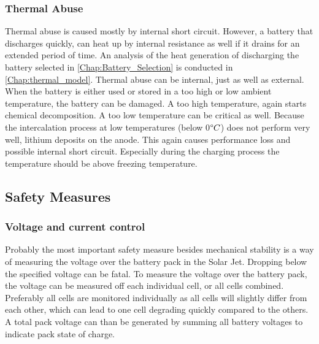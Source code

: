 \subsubsection{Thermal Abuse}
Thermal abuse is caused mostly by internal short circuit. However, a battery that discharges quickly, can heat up by internal resistance as well if it drains for an extended period of time. An analysis of the heat generation of discharging the battery selected in \ref{Chap:Battery_Selection} is conducted in \ref{Chap:thermal_model}. Thermal abuse can be internal, just as well as external. When the battery is either used or stored in a too high or low ambient temperature, the battery can be damaged. A too high temperature, again starts chemical decomposition. A too low temperature can be critical as well. Because the intercalation process at low temperatures (below 0\textit{$\degree C$}) does not perform very well, lithium deposits on the anode. This again causes performance loss and possible internal short circuit\cite{Petzl2015}. Especially during the charging process the temperature should be above freezing temperature.

\subsection{Safety Measures}
\label{Safety_measures}
\subsubsection{Voltage and current control}
Probably the most important safety measure besides mechanical stability is a way of measuring the voltage over the battery pack in the Solar Jet. Dropping below the specified voltage can be fatal. To measure the voltage over the battery pack, the voltage can be measured off each individual cell, or all cells combined. Preferably all cells are monitored individually as all cells will slightly differ from each other, which can lead to one cell degrading quickly compared to the others. A total pack voltage can than be generated by summing all battery voltages to indicate pack state of charge. 

